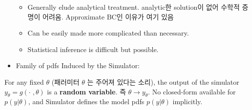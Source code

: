 \documentclass[
]{book}
\providecommand{\tightlist}{%
  \setlength{\itemsep}{0pt}\setlength{\parskip}{0pt}}
\begin{document}
\begin{itemize}
  \begin{itemize}
  \tightlist
  \item
    Generally elude analytical treatment. analytic한 solution이 없어 수학적 증명이 어려움. Approximate BC인 이유가 여기 있음
  \item
    Can be easily made more complicated than necessary.
  \item
    Statistical inference is difficult but possible.
  \end{itemize}
\item
  Family of pdfs Induced by the Simulator:
\end{itemize}

For any fixed \(\theta\) (패러미터 \(\theta\) 는 주어져 있다는 소리), the output of the simulator \(y_\theta = g( \cdot \; , \theta)\) is a \textbf{random variable}. 즉 \(\theta \longrightarrow y_\theta\). No closed-form available for \(p(y \vert \theta)\), and Simulator defines the model pdfs \(p(y \vert \theta)\) implicitly.
\end{document}
